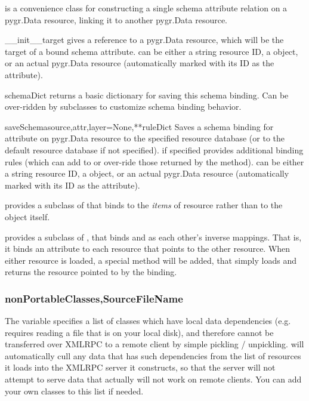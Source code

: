 \documentclass{howto}
\begin{document}
 is a convenience class for constructing 
a single schema attribute relation on a pygr.Data resource,
linking it to another pygr.Data resource.
\begin{funcdesc}{__init__}{target}
   gives a reference to a pygr.Data resource, which will
  be the target of a bound schema attribute.   can be either
  a string resource ID, a  object, or
  an actual pygr.Data resource (automatically marked with its ID
  as the  attribute).
\end{funcdesc}

\begin{funcdesc}{schemaDict}{}
  returns a basic  dictionary for saving this schema binding.
  Can be over-ridden by subclasses to customize schema binding behavior.
\end{funcdesc}

\begin{funcdesc}{saveSchema}{source,attr,layer=None,**ruleDict}
  Saves a schema binding for attribute  on pygr.Data resource
   to the specified resource database  (or
  to the default resource database if not specified).  
  if specified provides additional binding rules (which can add to or
  over-ride those returned by the  method).
   can be either
  a string resource ID, a  object, or
  an actual pygr.Data resource (automatically marked with its ID
  as the  attribute).
\end{funcdesc}

 provides a subclass of 
that binds to the {\em items} of resource  rather than to the
 object itself.

 provides a subclass of ,
that binds  and  as each other's inverse mappings.
That is, it binds an  attribute to each resource
that points to the other resource.  When either resource is loaded,
a special  method will be added, that simply
loads and returns the resource pointed to by the 
binding.

\subsubsection{nonPortableClasses,SourceFileName}
The variable  specifies a list of
classes which have local data dependencies (e.g. requires reading a file
that is on your local disk),
and therefore cannot be transferred over XMLRPC to a remote client
by simple pickling / unpickling.   will
automatically cull any data that has such dependencies from the list
of resources it loads into the XMLRPC server it constructs, so that
the server will not attempt to serve data that actually will not work
on remote clients.  You can add your own classes to this list if
needed.
\end{document}
